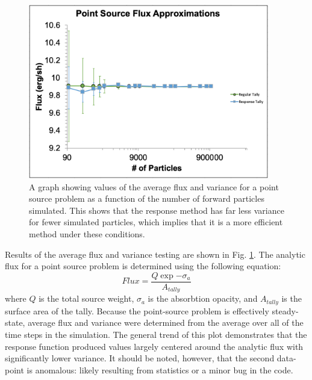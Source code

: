 \begin{figure} [h!]
	\centering
	\includegraphics[height=3in]{VarReduction/plots/point_src_errors.png}
	\caption{A graph showing values of the average flux and variance for a point source problem as a function of the number of forward particles simulated. This shows that the response method has far less variance for fewer simulated particles, which implies that it is a more efficient method under these conditions.}
	\label{fig:point_source_errors}
\end{figure}

Results of the average flux and variance testing are shown in Fig. \ref{fig:point_source_errors}. The analytic flux for a point source problem is determined using the following equation:
\begin{equation}
Flux = \frac{Q \exp{-\sigma_{a}}}{A_{tally}}
\end{equation}
where $Q$ is the total source weight, $\sigma_{a}$ is the absorbtion opacity, and $A_{tally}$ is the surface area of the tally. Because the point-source problem is effectively steady-state, average flux and variance were determined from the average over all of the time steps in the simulation. The general trend of this plot demonstrates that the response function produced values largely centered around the analytic flux with significantly lower variance. It should be noted, however, that the second data-point is anomalous: likely resulting from statistics or a minor bug in the code. 

